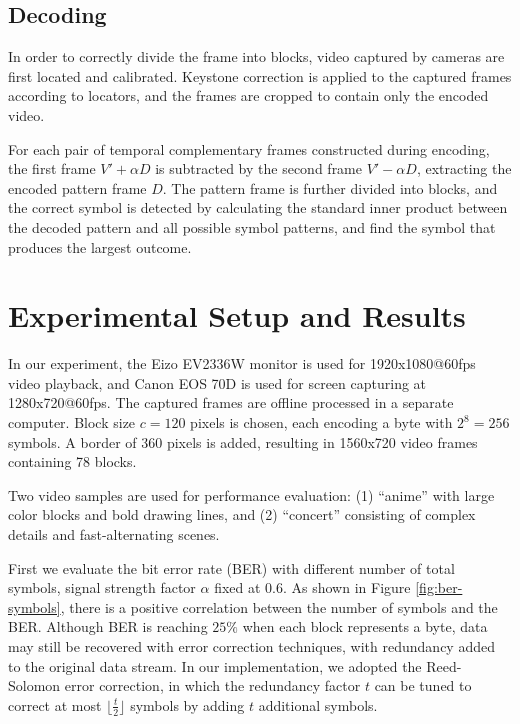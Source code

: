 \documentclass{acm_proc_article-sp}
\begin{document}
\subsection{Decoding}
In order to correctly divide the frame into blocks, video captured by cameras are first located and calibrated. Keystone correction is applied to the captured frames according to locators, and the frames are cropped to contain only the encoded video.

For each pair of temporal complementary frames constructed during encoding, the first frame $V'+\alpha D$ is subtracted by the second frame $V'-\alpha D$, extracting the encoded pattern frame $D$. The pattern frame is further divided into blocks, and the correct symbol is detected by calculating the standard inner product between the decoded pattern and all possible symbol patterns, and find the symbol that produces the largest outcome.

\section{Experimental Setup and Results}
In our experiment, the Eizo EV2336W monitor is used for 1920x1080@60fps video playback, and Canon EOS 70D is used for screen capturing at 1280x720@60fps. The captured frames are offline processed in a separate computer. Block size $c = 120$ pixels is chosen, each encoding a byte with $2^8 = 256$ symbols. A border of 360 pixels is added, resulting in 1560x720 video frames containing 78 blocks.

Two video samples are used for performance evaluation: (1) ``anime'' with large color blocks and bold drawing lines, and (2) ``concert'' consisting of complex details and fast-alternating scenes.

First we evaluate the bit error rate (BER) with different number of total symbols, signal strength factor $\alpha$ fixed at $0.6$. As shown in Figure \ref{fig:ber-symbols}, there is a positive correlation between the number of symbols and the BER. Although BER is reaching $25\%$ when each block represents a byte, data may still be recovered with error correction techniques, with redundancy added to the original data stream. In our implementation, we adopted the Reed-Solomon error correction\cite{reed1960polynomial}, in which the redundancy factor $t$ can be tuned to correct at most $\lfloor\frac{t}{2}\rfloor$ symbols by adding $t$ additional symbols.

\begin{figure}[t]
    \centering
    
\end{figure}
\end{document}
